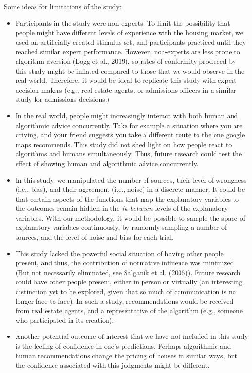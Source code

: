 \documentclass[
  man ,floatsintext]{apa7}
\begin{document}
Some ideas for limitations of the study:

\begin{itemize}
\item
  Participants in the study were non-experts. To limit the possibility that people might have different levels of experience with the housing market, we used an artificially created stimulus set, and participants practiced until they reached similar expert performance. However, non-experts are less prone to algorithm aversion (Logg et al., 2019), so rates of conformity produced by this study might be inflated compared to those that we would observe in the real world. Therefore, it would be ideal to replicate this study with expert decision makers (e.g., real estate agents, or admissions officers in a similar study for admissions decisions.)
\item
  In the real world, people might increasingly interact with both human and algorithmic advice concurrently. Take for example a situation where you are driving, and your friend suggests you take a different route to the one google maps recommends. This study did not shed light on how people react to algorithms and humans simultaneously. Thus, future research could test the effect of showing human and algorithmic advice concurrently.
\item
  In this study, we manipulated the number of sources, their level of wrongness (i.e., bias), and their agreement (i.e., noise) in a discrete manner. It could be that certain aspects of the functions that map the explanatory variables to the outcomes remain hidden in the \emph{in-between} levels of the explanatory variables. With our methodology, it would be possible to sample the space of explanatory variables continuously, by randomly sampling a number of sources, and the level of noise and bias for each trial.
\item
  This study lacked the powerful social situation of having other people present, and thus, the contribution of normative influence was minimized (But not necessarily eliminated, see Salganik et al. (2006)). Future research could have other people present, either in person or virtually (an interesting distinction yet to be explored, given that so much of communication is no longer face to face). In such a study, recommendations would be received from real estate agents, and a representative of the algorithm (e.g., someone who participated in its creation).
\item
  Another potential outcome of interest that we have not included in this study is the feeling of confidence in one's predictions. Perhaps algorithmic and human recommendations change the pricing of houses in similar ways, but the confidence associated with this judgments might be different.
\end{itemize}
\end{document}
